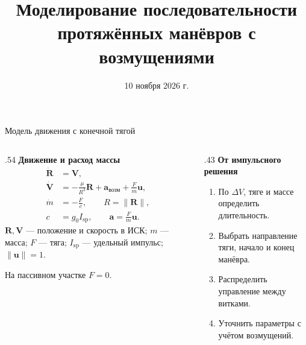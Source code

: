 \documentclass[11pt,aspectratio=169,t]{beamer}
\title{Моделирование последовательности\\протяжённых манёвров с возмущениями}
\date{10 ноября 2026 г.}
\newcommand{\eqcompact}{\fontsize{10}{12}\selectfont}
\newcommand{\derivationmathspacing}{%
  \setlength{\abovedisplayskip}{2pt}%
  \setlength{\belowdisplayskip}{3pt}%
  \setlength{\abovedisplayshortskip}{2pt}%
  \setlength{\belowdisplayshortskip}{2pt}%
  \setlength{\jot}{2pt}}
\newcommand{\vect}[1]{\boldsymbol{#1}}
\begin{document}
\begin{frame}[plain]\titlepage\end{frame}

\begin{frame}{Модель движения с конечной тягой}
\relax\derivationmathspacing
\begin{columns}[T,onlytextwidth]
\begin{column}{.54\textwidth}
\textbf{Движение и расход массы}
{\eqcompact\derivationmathspacing
\[
\begin{aligned}
 \dot{\vect R}&=\vect V,\\
 \dot{\vect V}&=-\frac{\mu}{R^3}\vect R+\vect a_{\text{возм}}
                   +\frac Fm\vect u,\\
 \dot m&=-\frac Fc,\qquad R=\|\vect R\|,\\
 c&=g_0I_{\mathrm{sp}},\qquad\vect a=\frac Fm\vect u.
\end{aligned}
\]
}
$\vect R,\vect V$ --- положение и скорость в ИСК; $m$ --- масса; $F$ --- тяга; $I_{\mathrm{sp}}$ --- удельный импульс; $\|\vect u\|=1$.
\par\smallskip
На пассивном участке $F=0$.
\end{column}
\begin{column}{.43\textwidth}
\textbf{От импульсного решения}
\begin{enumerate}
\setlength{\itemsep}{2pt}
\item По $\Delta V$, тяге и массе определить длительность.
\item Выбрать направление тяги, начало и конец манёвра.
\item Распределить управление между витками.
\item Уточнить параметры с учётом возмущений.
\end{enumerate}
\end{column}
\end{columns}
\end{frame}
\end{document}
